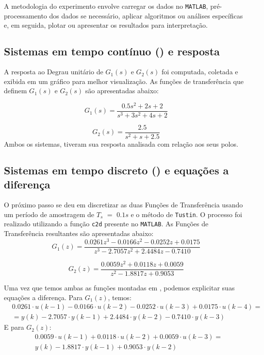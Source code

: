 \documentclass[a4paper,12pt]{article}
\begin{document}
A metodologia do experimento envolve carregar os dados no \texttt{MATLAB}, pré-processamento dos dados se necessário, aplicar algoritmos ou análises específicas e, em seguida, plotar ou apresentar os resultados para interpretação.

\subsection{Sistemas em tempo contínuo () e resposta}\label{3.1}

A resposta ao Degrau unitário de $G_1(s)$ e $G_2(s)$ foi computada, coletada e exibida em um gráfico para melhor visualização. As funções de transferência que definem $G_1(s)$ e $G_2(s)$ são apresentadas abaixo:

\begin{equation*}\label{3.1.1}
G_1(s) = \frac{0.5s^2 + 2s + 2}{s^3 + 3s^2 + 4s + 2} \tag{3.1.1}
\end{equation*}

\begin{equation*}\label{3.1.2}
G_2(s) = \frac{2.5}{s^2 + s + 2.5} \tag{3.1.2}
\end{equation*}
Ambos os sistemas, tiveram sua resposta analisada com relação aos seus polos.

\subsection{Sistemas em tempo discreto () e equações a diferença}\label{3.2}

O próximo passo se deu em discretizar as duas Funções de Transferência usando um período de amostragem de $T_s$ $=$ $0.1s$ e o método de \texttt{Tustin}. O processo foi realizado utilizando a função \texttt{c2d} presente no \texttt{MATLAB}. As Funções de Transferência resultantes são apresentadas abaixo:
\begin{equation*}\label{3.2.1}
G_1(z) = \frac{0.0261z^3 - 0.0166z^2 - 0.0252z + 0.0175}{z^3 - 2.7057z^2 + 2.4484z - 0.7410} \tag{3.2.1}
\end{equation*}

\begin{equation*}\label{3.2.2}
G_2(z) = \frac{0.0059z^2 + 0.0118z + 0.0059}{z^2 - 1.8817z + 0.9053} \tag{3.2.2}
\end{equation*}

Uma vez que temos ambas as funções montadas em , podemos explicitar suas equações a diferença. Para $G_1(z)$, temos:
\begin{align}\label{3.2.3}
&0.0261 \cdot u(k-1) - 0.0166 \cdot u(k-2) - 0.0252 \cdot u(k-3) + 0.0175 \cdot u(k-4) = \nonumber \\
&= y(k) - 2.7057 \cdot y(k-1) + 2.4484 \cdot y(k-2) - 0.7410 \cdot y(k-3) \tag{3.2.3}
\end{align}
E para $G_2(z)$:
\begin{align}\label{3.2.4}
& 0.0059 \cdot u(k-1) + 0.0118 \cdot u(k-2) + 0.0059 \cdot u(k-3) = \nonumber \\
& y(k)  - 1.8817 \cdot y(k-1) + 0.9053 \cdot y(k-2) \tag{3.2.4}
\end{align}
\end{document}
